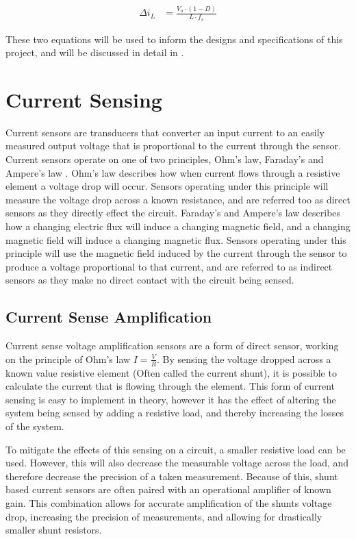 \begin{align}\label{E:delta_i}
   \Delta i_L &= \frac{ V_{o} \cdot \left( 1 - D \right) } {L \cdot f_s}
\end{align}

These two equations will be used to inform the designs and specifications of this project, and will be discussed in detail in .




\section{Current Sensing}\label{S:current_sense_back}

Current sensors are transducers that converter an input current to an easily measured output voltage that is proportional to the current through the sensor. Current sensors operate on one of two principles, Ohm's law, Faraday’s and Ampere’s law \cite{current_sensor_types}.  Ohm's law describes how when current flows through a resistive element a voltage drop will occur. Sensors operating under this principle will measure the voltage drop across a known resistance, and are referred too as direct sensors as they directly effect the circuit. Faraday’s and Ampere’s law describes how a changing electric flux will induce a changing magnetic field, and a changing magnetic field will induce a changing magnetic flux. Sensors operating under this principle will use the magnetic field induced by the current through the sensor to produce a voltage proportional to that current, and are referred to as indirect sensors as they make no direct contact with the circuit being sensed. 


\subsection{Current Sense Amplification}\label{S:current_shunt_back}

Current sense voltage amplification sensors are a form of direct sensor, working on the principle of Ohm's law $I=\frac{V}{R}$. By sensing the voltage dropped across a known value resistive element (Often called the current shunt), it is possible to calculate the current that is flowing through the element. This form of current sensing is easy to implement in theory, however it has the effect of altering the system being sensed by adding a resistive load, and thereby increasing the losses of the system. 

To mitigate the effects of this sensing on a circuit, a smaller resistive load can be used. However, this will also decrease the measurable voltage across the load, and therefore decrease the precision of a taken measurement. Because of this, shunt based current sensors are often paired with an operational amplifier of known gain. This combination allows for accurate amplification of the shunts voltage drop, increasing the precision of measurements, and allowing for drastically smaller shunt resistors. 


